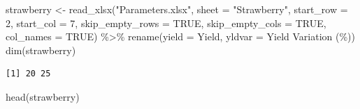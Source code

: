 \documentclass[
  letterpaper,
  DIV=11,
  numbers=noendperiod]{scrartcl}
\newenvironment{Shaded}{\begin{snugshade}}{\end{snugshade}}
\newcommand{\AttributeTok}[1]{\textcolor[rgb]{0.40,0.45,0.13}{#1}}
\newcommand{\ConstantTok}[1]{\textcolor[rgb]{0.56,0.35,0.01}{#1}}
\newcommand{\DecValTok}[1]{\textcolor[rgb]{0.68,0.00,0.00}{#1}}
\newcommand{\FunctionTok}[1]{\textcolor[rgb]{0.28,0.35,0.67}{#1}}
\newcommand{\NormalTok}[1]{\textcolor[rgb]{0.00,0.23,0.31}{#1}}
\newcommand{\OtherTok}[1]{\textcolor[rgb]{0.00,0.23,0.31}{#1}}
\newcommand{\SpecialCharTok}[1]{\textcolor[rgb]{0.37,0.37,0.37}{#1}}
\newcommand{\StringTok}[1]{\textcolor[rgb]{0.13,0.47,0.30}{#1}}
\begin{document}
\begin{Shaded}
\begin{Highlighting}[]
\NormalTok{strawberry }\OtherTok{\textless{}{-}} \FunctionTok{read\_xlsx}\NormalTok{(}\StringTok{"Parameters.xlsx"}\NormalTok{,}
                        \AttributeTok{sheet =} \StringTok{"Strawberry"}\NormalTok{,}
                        \AttributeTok{start\_row =} \DecValTok{2}\NormalTok{,}
                        \AttributeTok{start\_col =} \DecValTok{7}\NormalTok{,}
                        \AttributeTok{skip\_empty\_rows =} \ConstantTok{TRUE}\NormalTok{,}
                        \AttributeTok{skip\_empty\_cols =} \ConstantTok{TRUE}\NormalTok{,}
                        \AttributeTok{col\_names =} \ConstantTok{TRUE}\NormalTok{) }\SpecialCharTok{\%\textgreater{}\%} 
  \FunctionTok{rename}\NormalTok{(}\AttributeTok{yield =}\NormalTok{ Yield,}
         \AttributeTok{yldvar =} \StringTok{\textasciigrave{}}\AttributeTok{Yield Variation (\%)}\StringTok{\textasciigrave{}}\NormalTok{)}
\FunctionTok{dim}\NormalTok{(strawberry)}
\end{Highlighting}
\end{Shaded}

\begin{verbatim}
[1] 20 25
\end{verbatim}

\begin{Shaded}
\begin{Highlighting}[]
\FunctionTok{head}\NormalTok{(strawberry)}
\end{Highlighting}
\end{Shaded}
\end{document}
